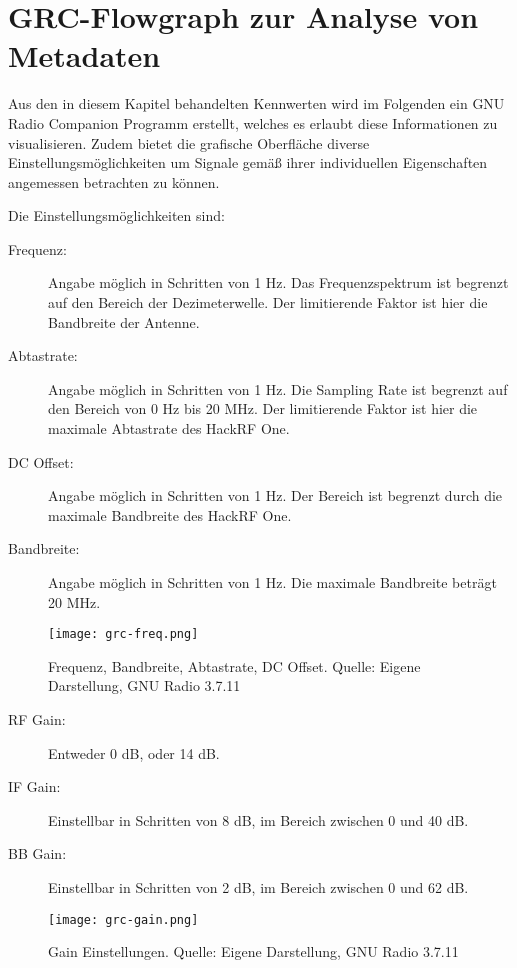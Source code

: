 \newpage
\section{GRC-Flowgraph zur Analyse von Metadaten}
Aus den in diesem Kapitel behandelten Kennwerten wird im Folgenden ein GNU Radio Companion Programm erstellt, welches es erlaubt diese Informationen zu visualisieren. Zudem bietet die grafische Oberfläche diverse Einstellungsmöglichkeiten um Signale gemäß ihrer individuellen Eigenschaften angemessen betrachten zu können.

Die Einstellungsmöglichkeiten sind:

\begin{description}
	\item [Frequenz:] Angabe möglich in Schritten von 1 Hz. Das Frequenzspektrum ist begrenzt auf den Bereich der Dezimeterwelle. Der limitierende Faktor ist hier die Bandbreite der Antenne.
	\item [Abtastrate:] Angabe möglich in Schritten von 1 Hz. Die Sampling Rate ist begrenzt auf den Bereich von 0 Hz bis 20 MHz. Der limitierende Faktor ist hier die maximale Abtastrate des HackRF One.
	\item [DC Offset:]  Angabe möglich in Schritten von 1 Hz. Der Bereich ist begrenzt durch die maximale Bandbreite des HackRF One.
	\item[Bandbreite:] Angabe möglich in Schritten von 1 Hz. Die maximale Bandbreite beträgt 20 MHz. 
\end{description}

\begin{figure}[ht]
	\centering
	\texttt{[image: grc-freq.png]}
	\caption[Frequenz, Bandbreite, Abtastrate, DC Offset]{Frequenz, Bandbreite, Abtastrate, DC Offset. Quelle: Eigene Darstellung, GNU Radio 3.7.11} 
	\label{grc-freq}
\end{figure}

\newpage
\begin{description}
	\item[RF Gain:] Entweder 0 dB, oder 14 dB. 
	\item[IF Gain:] Einstellbar in Schritten von 8 dB, im Bereich zwischen 0 und 40 dB.
	\item[BB Gain:] Einstellbar in Schritten von 2 dB, im Bereich zwischen 0 und 62 dB.
\end{description}

\begin{figure}[ht]
	\centering
	\texttt{[image: grc-gain.png]}
	\caption[Gain Einstellungen]{Gain Einstellungen. Quelle: Eigene Darstellung, GNU Radio 3.7.11} 
	\label{grc-gain}
\end{figure}


